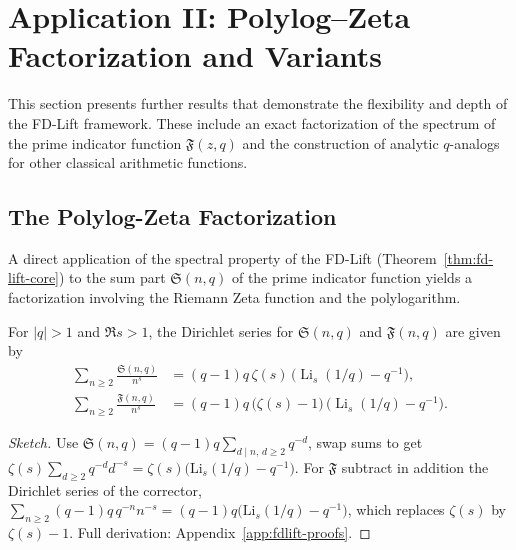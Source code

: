 \section{Application II: Polylog–Zeta Factorization and Variants}\label{sec:application-key-results}

This section presents further results that demonstrate the flexibility and depth of the FD-Lift framework. These include an exact factorization of the spectrum of the prime indicator function $\mathfrak{F}(z,q)$ and the construction of analytic $q$-analogs for other classical arithmetic functions.

\subsection{The Polylog-Zeta Factorization}

A direct application of the spectral property of the FD-Lift (Theorem~\ref{thm:fd-lift-core}) to the sum part $\mathfrak{S}(n,q)$ of the prime indicator function yields a factorization involving the Riemann Zeta function and the polylogarithm.

\begin{theorem}\label{thm:polylog-zeta}
For $|q|>1$ and $\Re s>1$, the Dirichlet series for $\mathfrak{S}(n,q)$ and $\mathfrak{F}(n,q)$ are given by
\begin{align*}
\sum_{n\ge2}\frac{\mathfrak{S}(n,q)}{n^{s}}
&=(q-1)q\,\zeta(s)\,\bigl(\operatorname{Li}_{s}(1/q)-q^{-1}\bigr), \\
\sum_{n\ge2}\frac{\mathfrak{F}(n,q)}{n^{s}}
&=(q-1)q\,\bigl(\zeta(s)-1\bigr)\,\bigl(\operatorname{Li}_{s}(1/q)-q^{-1}\bigr).
\end{align*}
\end{theorem}
\begin{proof}[Sketch]
Use $\mathfrak S(n,q)=(q\!-\!1)q\sum_{d\mid n,\, d\ge2}q^{-d}$, swap sums to get $\zeta(s)\sum_{d\ge2}q^{-d}d^{-s}=\zeta(s)\big(\mathrm{Li}_s(1/q)-q^{-1}\big)$.
For $\mathfrak F$ subtract in addition the Dirichlet series of the corrector, $\sum_{n\ge2}(q-1)q\,q^{-n}n^{-s}=(q-1)q\big(\mathrm{Li}_s(1/q)-q^{-1}\big)$, which replaces $\zeta(s)$ by $\zeta(s)-1$.
Full derivation: Appendix~\ref{app:fdlift-proofs}.
\end{proof}

